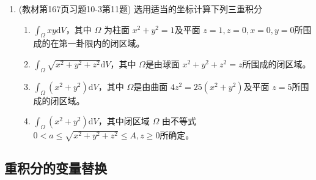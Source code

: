 \begin{enumerate}
    \item (教材第167页习题10-3第11题) 选用适当的坐标计算下列三重积分
        \begin{enumerate}[(1)]
            \item $\int _\Omega xy \mathrm{d}V$，其中 $\Omega$ 为柱面 $x^2 + y^2=1$及平面 $z=1,z=0,x=0,y=0$所围成的在第一卦限内的闭区域。
            \item $\int _\Omega \sqrt{x^2 + y^2 + z^2} \mathrm{d} V$，其中 $\Omega$是由球面 $x^2+y^2+z^2=z$所围成的闭区域。
            \item $\int _\Omega(x^2 +y^2) \mathrm{d}V$，其中 $\Omega$是由曲面 $4z^2=25(x^2+y^2)$及平面 $z=5$所围成的闭区域。
            \item $\int _\Omega (x^2 + y^2) \mathrm{d} V$，其中闭区域 $\Omega$ 由不等式 $0 < a \le \sqrt{x^2 + y^2 + z^2} \le A, z \ge 0$所确定。
        \end{enumerate}
\end{enumerate}

\subsection{重积分的变量替换}
